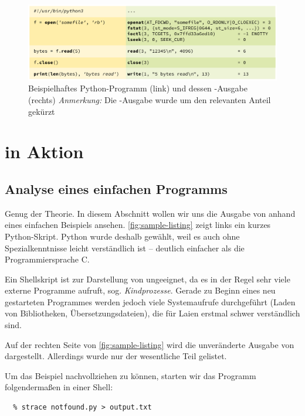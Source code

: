 \begin{figure}[t]
  \centering

  \includegraphics[scale=.8]{../images/sample-listing}
  \caption{Beispielhaftes Python-Programm (link) und dessen \strace-Ausgabe (rechts) \newline
  \emph{Anmerkung:} Die \strace-Ausgabe wurde um den relevanten Anteil gekürzt
  }
  \label{fig:sample-listing}
\end{figure}

\section{\strace{} in Aktion}

\subsection{Analyse eines einfachen Programms}
\label{sec:simpleprogram}

Genug der Theorie. In diesem Abschnitt wollen wir uns die Ausgabe von \strace{} anhand eines
einfachen Beispiels ansehen. \autoref{fig:sample-listing} zeigt links ein kurzes Python-Skript.
Python wurde deshalb gewählt, weil es auch ohne Spezialkenntnisse leicht verständlich ist --
deutlich einfacher als die Programmiersprache C.

Ein Shellskript ist zur Darstellung von \strace{} ungeeignet, da es in der Regel sehr viele externe
Programme aufruft, sog. \emph{Kindprozesse}. Gerade zu Beginn eines neu gestarteten Programmes
werden jedoch viele Systemaufrufe durchgeführt (Laden von Bibliotheken, Übersetzungsdateien),
die für Laien erstmal schwer verständlich sind.


Auf der rechten Seite von \autoref{fig:sample-listing} wird die unveränderte Ausgabe von \strace{}
dargestellt. Allerdings wurde nur der wesentliche Teil gelistet.

Um das Beispiel nachvollziehen zu können, starten wir das Programm folgendermaßen in einer Shell:

\begin{lstlisting}
  % strace notfound.py > output.txt
\end{lstlisting}

